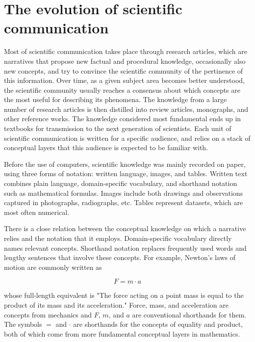 \section{The evolution of scientific communication}
\label{evolution}

Most of scientific communication takes place through research articles, which are narratives that propose new factual and procedural knowledge, occasionally also new concepts, and try to convince the scientific community of the pertinence of this information. Over time, as a given subject area becomes better understood, the scientific community usually reaches a consensus about which concepts are the most useful for describing its phenomena. The knowledge from a large number of research articles is then distilled into review articles, monographs, and other reference works. The knowledge considered most fundamental ends up in textbooks for transmission to the next generation of scientists. Each unit of scientific communication is written for a specific audience, and relies on a stack of conceptual layers that this audience is expected to be familiar with.

Before the use of computers, scientific knowledge was mainly recorded on paper, using three forms of notation: written language, images, and tables. Written text combines plain language, domain-specific vocabulary, and shorthand notation such as mathematical formulas. Images include both drawings and observations captured in photographs, radiographs, etc. Tables represent datasets, which are most often numerical.

There is a close relation between the conceptual knowledge on which a narrative relies and the notation that it employs. Domain-specific vocabulary directly names relevant concepts. Shorthand notation replaces frequently used words and lengthy sentences that involve these concepts. For example, Newton's laws of motion are commonly written as

\[

   F = m \cdot a
\]

whose full-length equivalent is "The force acting on a point mass is equal to the product of its mass and its acceleration." Force, mass, and acceleration are concepts from mechanics and $F$, $m$, and $a$ are conventional shorthands for them. The symbols $=$ and $\cdot$ are shorthands for the concepts of equality and product, both of which come from more fundamental conceptual layers in mathematics.

